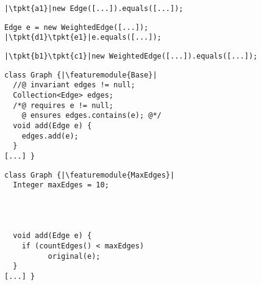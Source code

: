 \newsavebox{\bhone}
\begin{lrbox}{\bhone}
	\begin{minipage}{40mm}
\begin{lstlisting}
|\tpkt{a1}|new Edge([...]).equals([...]);
\end{lstlisting}
	\end{minipage}
\end{lrbox}

\newsavebox{\bhtwo}
\begin{lrbox}{\bhtwo}
	\begin{minipage}{40mm}
\begin{lstlisting}
Edge e = new WeightedEdge([...]);
|\tpkt{d1}\tpkt{e1}|e.equals([...]);
\end{lstlisting}
	\end{minipage}
\end{lrbox}

\newsavebox{\bhthree}
\begin{lrbox}{\bhthree}
	\begin{minipage}{40mm}
\begin{lstlisting}
|\tpkt{b1}\tpkt{c1}|new WeightedEdge([...]).equals([...]);
\end{lstlisting}
	\end{minipage}
\end{lrbox}


\newsavebox{\ecrbase}
\begin{lrbox}{\ecrbase}
	\begin{minipage}{62mm}
\begin{lstlisting}
class Graph {|\featuremodule{Base}|
  //@ invariant edges != null;
  Collection<Edge> edges;
  /*@ requires e != null;
    @ ensures edges.contains(e); @*/
  void add(Edge e) {
    edges.add(e);
  }
[...] }
\end{lstlisting}
	\end{minipage}
\end{lrbox}

\newsavebox{\ecrmaxoc}
\begin{lrbox}{\ecrmaxoc}
	\begin{minipage}{62mm}
\begin{lstlisting}
class Graph {|\featuremodule{MaxEdges}|
  Integer maxEdges = 10;




  void add(Edge e) {
    if (countEdges() < maxEdges)
		  original(e);
  }
[...] }
\end{lstlisting}
	\end{minipage}
\end{lrbox}

